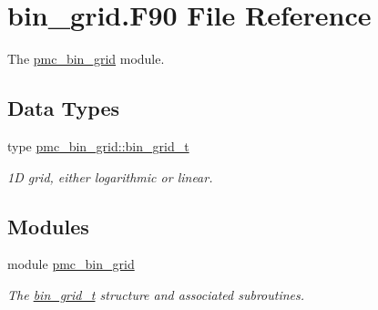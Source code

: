 \hypertarget{bin__grid_8_f90}{}\section{bin\+\_\+grid.\+F90 File Reference}
\label{bin__grid_8_f90}


The \mbox{\hyperlink{namespacepmc__bin__grid}{pmc\+\_\+bin\+\_\+grid}} module.  


\subsection*{Data Types}
\begin{DoxyCompactItemize}
\item 
type \mbox{\hyperlink{structpmc__bin__grid_1_1bin__grid__t}{pmc\+\_\+bin\+\_\+grid\+::bin\+\_\+grid\+\_\+t}}
\begin{DoxyCompactList}\small\item\em 1D grid, either logarithmic or linear. \end{DoxyCompactList}\end{DoxyCompactItemize}
\subsection*{Modules}
\begin{DoxyCompactItemize}
\item 
module \mbox{\hyperlink{namespacepmc__bin__grid}{pmc\+\_\+bin\+\_\+grid}}
\begin{DoxyCompactList}\small\item\em The \mbox{\hyperlink{structpmc__bin__grid_1_1bin__grid__t}{bin\+\_\+grid\+\_\+t}} structure and associated subroutines. \end{DoxyCompactList}\end{DoxyCompactItemize}
